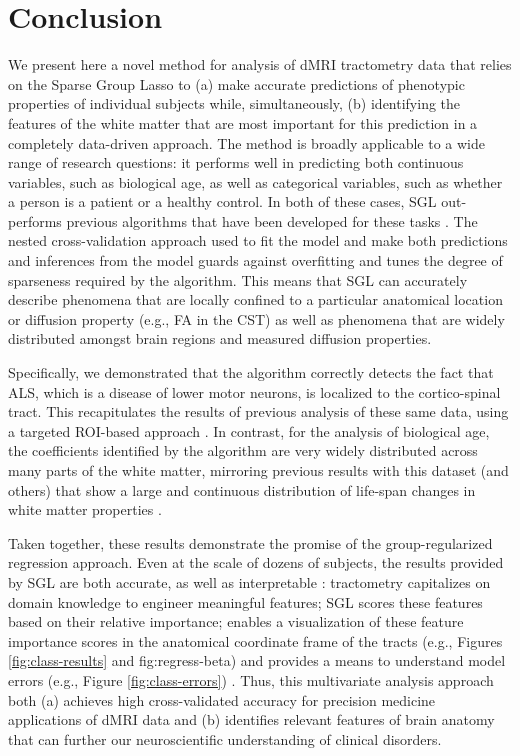 \section*{Conclusion}

We present here a novel method for analysis of dMRI tractometry data that relies
on the Sparse Group Lasso \cite{simon2013sparse} to (a) make accurate
predictions of phenotypic properties of individual subjects while,
simultaneously, (b) identifying the features of the white matter that are most
important for this prediction in a completely data-driven approach. The method
is broadly applicable to a wide range of research questions: it performs well in
predicting both continuous variables, such as biological age, as well as
categorical variables, such as whether a person is a patient or a healthy
control. In both of these cases, SGL out-performs previous algorithms that have
been developed for these tasks \cite{sarica2017corticospinal, Richard2018-ux}.
The nested cross-validation approach used to fit the model and make both
predictions and inferences from the model guards against overfitting and tunes
the degree of sparseness required by the algorithm. This means that SGL can
accurately describe phenomena that are locally confined to a particular
anatomical location or diffusion property (e.g., FA in the CST) as well as
phenomena that are widely distributed amongst brain regions and measured
diffusion properties.

Specifically, we demonstrated that the algorithm correctly detects
the fact that ALS, which is a disease of lower motor neurons, is
localized to the cortico-spinal tract. This recapitulates the results
of previous analysis of these same data, using a targeted ROI-based
approach \cite{sarica2017corticospinal}. In contrast, for the analysis
of biological age, the coefficients identified by the algorithm are very
widely distributed across many parts of the white matter, mirroring
previous results with this dataset (and others) that show a large and
continuous distribution of life-span changes in white matter properties
\cite{yeatman2014lifespan}.

Taken together, these results demonstrate the promise of the group-regularized
regression approach. Even at the scale of dozens of subjects, the results
provided by SGL are both accurate, as well as interpretable
\cite{Murdoch2019-ax}: tractometry capitalizes on domain knowledge to engineer
meaningful features; SGL scores these features based on their relative
importance; enables a visualization of these feature importance scores in the
anatomical coordinate frame of the tracts (e.g., Figures \ref{fig:class-results}
and fig:regress-beta) and provides a means to understand model errors (e.g.,
Figure \ref{fig:class-errors}) . Thus, this multivariate analysis approach both
(a) achieves high cross-validated accuracy for precision medicine applications
of dMRI data and (b) identifies relevant features of brain anatomy that can
further our neuroscientific understanding of clinical disorders.

